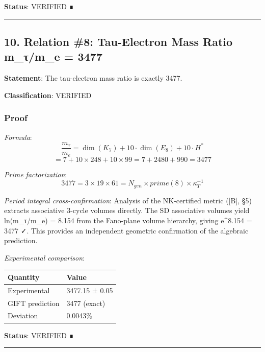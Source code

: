 \documentclass[11pt,a4paper]{article}
\begin{document}
\textbf{Status}: VERIFIED ∎

\begin{center}\rule{0.5\linewidth}{0.5pt}\end{center}

\subsection{10. Relation \#8: Tau-Electron Mass Ratio m\_τ/m\_e = 3477}\label{relation-8-tau-electron-mass-ratio-m_ux3c4m_e-3477}

\textbf{Statement}: The tau-electron mass ratio is exactly 3477.

\textbf{Classification}: VERIFIED

\subsubsection{Proof}\label{proof-6}

\emph{Formula}:
\[\frac{m_\tau}{m_e} = \dim(K_7) + 10 \cdot \dim(E_8) + 10 \cdot H^*\]
\[= 7 + 10 \times 248 + 10 \times 99 = 7 + 2480 + 990 = 3477\]

\emph{Prime factorization}:
\[3477 = 3 \times 19 \times 61 = N_{gen} \times prime(8) \times \kappa_T^{-1}\]

\emph{Period integral cross-confirmation}: Analysis of the NK-certified metric ([B], §5) extracts associative 3-cycle volumes directly. The SD associative volumes yield ln(m\_τ/m\_e) = 8.154 from the Fano-plane volume hierarchy, giving e\^{}8.154 = 3477 ✓. This provides an independent geometric confirmation of the algebraic prediction.

\emph{Experimental comparison}:

{\def\LTcaptype{none} %
\begin{longtable}[]{@{}ll@{}}
\toprule\noalign{}
Quantity & Value \\
\midrule\noalign{}
\endhead
\bottomrule\noalign{}
\endlastfoot
Experimental & 3477.15 ± 0.05 \\
GIFT prediction & 3477 (exact) \\
Deviation & 0.0043\% \\
\end{longtable}
}

\textbf{Status}: VERIFIED ∎

\begin{center}\rule{0.5\linewidth}{0.5pt}\end{center}
\end{document}
